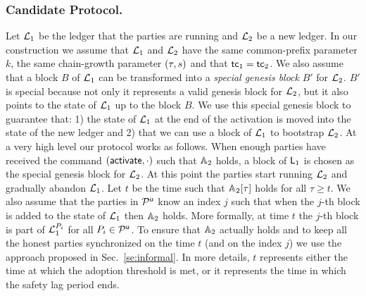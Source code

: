 \subsubsection{Candidate Protocol.}

Let $\mathcal{L}_1$ be the ledger that the parties are running and $\mathcal{L}_2$ be a new ledger.
In our construction we assume that $\mathcal{L}_1$ and $\mathcal{L}_2$ have the same common-prefix parameter $k$, the same chain-growth parameter $(\tau, s)$ and that $\mathsf{tc}_1=\mathsf{tc}_2$. We also assume that a block $B$ of $\mathcal{L}_1$ can be transformed into a \emph{special genesis block} $B'$ for $\mathcal{L}_2$. $B'$ is special because not only it represents a valid genesis block for $\mathcal{L}_2$, but it also points to the state of $\mathcal{L}_1$ up to the block $B$. 
We use this special genesis block to guarantee that: 1) the state of $\mathcal{L}_1$ at the end of the activation is moved into the state of the new ledger
and 2) that we can use a block of $\mathcal{L}_1$ to bootstrap $\mathcal{L}_2$.
At a very high level our protocol works as follows. When enough parties have received the command $(\mathsf{activate},\cdot)$ such that $\mathbb{A}_2$ holds,
a block of $\mathsf{L}_1$ is chosen as the special genesis block for $\mathcal{L}_2$. At this point the parties start running $\mathcal{L}_2$ and gradually abandon 
$\mathcal{L}_1$.
Let $t$ be the time such that  $\mathbb{A}_2[\tau]$ holds for all $\tau\geq t$.
We also assume that the parties in $\mathcal{P}^\mathsf{u}$ know an index $j$ such that when the $j$-th block is added to the state of $\mathcal{L}_1$ then $\mathbb{A}_2$ holds. 
More formally, at time $t$ the $j$-th block is part of $\mathcal{L}_1^{P_i}$ for all $P_i\in\mathcal{P}^\mathsf{u}$.
To ensure that $\mathbb{A}_2$ actually holds and to keep all the honest parties synchronized on the time $t$ (and on the index $j$) we use the approach proposed in Sec.~\ref{se:informal}.
In more details, $t$ represents either the time at which the adoption threshold is met, or it represents the time in which the safety lag period ends.
 

